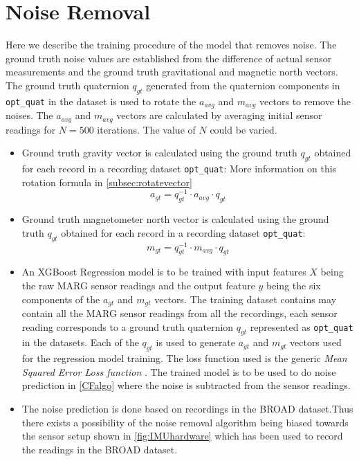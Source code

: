 \documentclass{iutbscthesis}
\begin{document}
\section{Noise Removal} \label{section:noise_removal}
Here we describe the training procedure of the model that removes noise. The ground truth noise values are established from the difference of actual sensor measurements and the ground truth gravitational and magnetic north vectors. The ground truth quaternion $q_{gt}$ generated from the quaternion components in \texttt{opt\_quat} in the dataset is used to rotate the $a_{avg}$ and $m_{avg}$ vectors to remove the noises. The $a_{avg}$ and $m_{avg}$ vectors are calculated by averaging initial sensor readings for $N=500$ iterations. The value of $N$ could be varied.
\begin{itemize}
    \item Ground truth gravity vector is calculated using the ground  truth $q_{gt}$ obtained for each record in a recording dataset \texttt{opt\_quat}:
    More information on this rotation formula in \autoref{subsec:rotatevector}
    \begin{equation} \label{eqn:acc noise removal} 
        a_{gt} = q_{gt}^{-1} \cdot a_{avg} \cdot q_{gt}
    \end{equation}
    \item Ground truth magnetometer north vector is calculated using the ground  truth $q_{gt}$ obtained for each record in a recording dataset \texttt{opt\_quat}:
    \begin{equation} \label{eqn:mag noise removal}
        m_{gt} = q_{gt}^{-1} \cdot m_{avg} \cdot q_{gt}
    \end{equation}
    \item An XGBoost Regression model\cite{chen2016xgboost} is to be trained with input features $X$ being the raw MARG sensor readings and the output feature $y$ being the six components of the $a_{gt}$ and $m_{gt}$ vectors. The training dataset contains may contain all the MARG sensor readings from all the recordings, each sensor reading corresponds to a ground truth quaternion $q_{gt}$ represented as \texttt{opt\_quat} in the datasets. Each of the $q_{gt}$ is used to generate $a_{gt}$ and $m_{gt}$ vectors used for the regression model training. The loss function used is the generic \textit{Mean Squared Error Loss function} \cite{bickel2015mathematical}. The trained model is to be used to do noise prediction in \autoref{CFalgo} where the noise is subtracted from the sensor readings.
    \item The noise prediction is done based on recordings in the BROAD dataset\cite{BROAD}.Thus there exists a possibility of the noise removal algorithm being biased towards the sensor setup shown in \autoref{fig:IMUhardware} which has been used to record the readings in the BROAD dataset.
\end{itemize}
\end{document}
